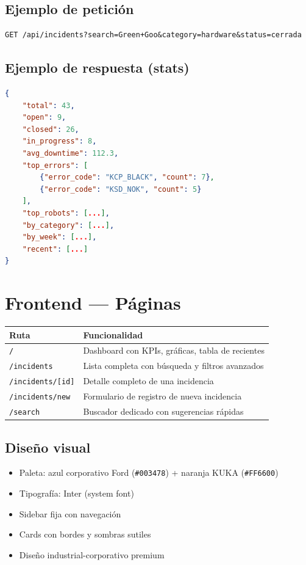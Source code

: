 \documentclass[11pt,a4paper]{article}
\begin{document}
\subsection{Ejemplo de petición}

\begin{lstlisting}
GET /api/incidents?search=Green+Goo&category=hardware&status=cerrada
\end{lstlisting}

\subsection{Ejemplo de respuesta (stats)}

\begin{lstlisting}[language=json]
{
    "total": 43,
    "open": 9,
    "closed": 26,
    "in_progress": 8,
    "avg_downtime": 112.3,
    "top_errors": [
        {"error_code": "KCP_BLACK", "count": 7},
        {"error_code": "KSD_NOK", "count": 5}
    ],
    "top_robots": [...],
    "by_category": [...],
    "by_week": [...],
    "recent": [...]
}
\end{lstlisting}

\section{Frontend --- Páginas}

\begin{center}
\begin{tabularx}{\textwidth}{lX}
\toprule
\textbf{Ruta} & \textbf{Funcionalidad} \\
\midrule
\texttt{/} & Dashboard con KPIs, gráficas, tabla de recientes \\
\texttt{/incidents} & Lista completa con búsqueda y filtros avanzados \\
\texttt{/incidents/[id]} & Detalle completo de una incidencia \\
\texttt{/incidents/new} & Formulario de registro de nueva incidencia \\
\texttt{/search} & Buscador dedicado con sugerencias rápidas \\
\bottomrule
\end{tabularx}
\end{center}

\subsection{Diseño visual}

\begin{itemize}[noitemsep]
    \item Paleta: azul corporativo Ford (\texttt{\#003478}) + naranja KUKA (\texttt{\#FF6600})
    \item Tipografía: Inter (system font)
    \item Sidebar fija con navegación
    \item Cards con bordes y sombras sutiles
    \item Diseño industrial-corporativo premium
\end{itemize}
\end{document}
